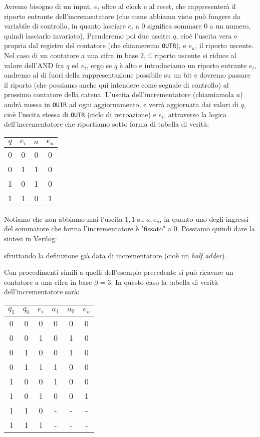 \documentclass[a4paper,11pt]{article}
\begin{document}
Avremo bisogno di un input, $e_i$ oltre al clock e al reset, che rappresenterà il riporto entrante dell'incrementatore (che come abbiamo visto può fungere da variabile di controllo, in quanto lasciare $e_i$ a 0 significa sommare 0 a un numero, quindi lasciarlo invariato),
Prenderemo poi due uscite: $q$, cioè l'uscita vera e propria dal registro del contatore (che chiameremo \lstinline|OUTR|), e $e_u$, il riporto uscente.
Nel caso di un contatore a una cifra in base 2, il riporto uscente si riduce al valore dell'AND fra $q$ ed $e_i$, ergo se $q$ è alto e introduciamo un riporto entrante $e_i$, andremo al di fuori della rappresentazione possibile su un bit e dovremo passare il riporto (che possiamo anche qui intendere come segnale di controllo) al prossimo contatore della catena.
L'uscita dell'incrementatore (chiamiamola $a$) andrà messa in \lstinline|OUTR| ad ogni aggiornamento, e verrà aggiornata dai valori di $q$, cioè l'uscita stessa di \lstinline|OUTR| (ciclo di retroazione) e $e_i$, attraverso la logica dell'incrementatore che riportiamo sotto forma di tabella di verità:

\begin{table}[H]
	\center 
	\begin{tabular} { c c | c c }
		$q$ & $e_i$ & $a$ & $e_u$ \\ 
		\hline
		0 & 0 & 0 & 0 \\ 
		0 & 1 & 1 & 0 \\ 
		1 & 0 & 1 & 0 \\ 
		1 & 1 & 0 & 1 \\
	\end{tabular}
\end{table}

Notiamo che non abbiamo mai l'uscita $1, 1$ su $a, e_u$, in quanto uno degli ingressi del sommatore che forma l'incrementatore è "fissato" a 0.
Possiamo quindi dare la sintesi in Verilog:


sfruttando la definizione già data di incrementatore (cioè un \textit{half adder}).

Con procedimenti simili a quelli dell'esempio precedente si può ricavare un contatore a una cifra in base $\beta = 3$.
In questo caso la tabella di verità dell'incrementatore sarà:
\begin{table}[H]
	\center 
	\begin{tabular} { c c c | c c c }
		$q_1$ & $q_0$ & $e_i$ & $a_1$ & $a_0$ & $e_u$ \\ 
		\hline
		0 & 0 & 0 & 0 & 0 & 0 \\ 
		0 & 0 & 1 & 0 & 1 & 0 \\ 
		0 & 1 & 0 & 0 & 1 & 0 \\ 
		0 & 1 & 1 & 1 & 0 & 0 \\
		1 & 0 & 0 & 1 & 0 & 0 \\ 
		1 & 0 & 1 & 0 & 0 & 1 \\ 
		1 & 1 & 0 & - & - & - \\ 
		1 & 1 & 1 & - & - & -
	\end{tabular}
\end{table}
\end{document}

